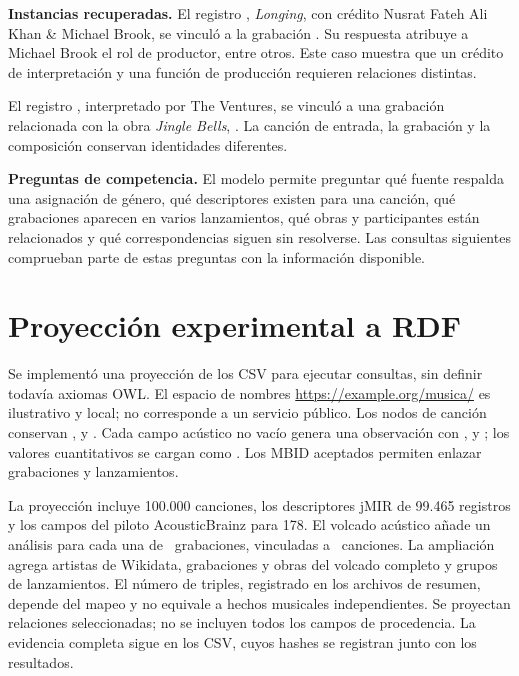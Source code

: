 \documentclass[11pt,a4paper]{article}
\begin{document}
\textbf{Instancias recuperadas.} El registro , \emph{Longing}, con crédito Nusrat Fateh Ali Khan \& Michael Brook, se vinculó a la grabación . Su respuesta atribuye a Michael Brook el rol de productor, entre otros. Este caso muestra que un crédito de interpretación y una función de producción requieren relaciones distintas.

El registro , interpretado por The Ventures, se vinculó a una grabación relacionada con la obra \emph{Jingle Bells}, . La canción de entrada, la grabación y la composición conservan identidades diferentes.

\textbf{Preguntas de competencia.} El modelo permite preguntar qué fuente respalda una asignación de género, qué descriptores existen para una canción, qué grabaciones aparecen en varios lanzamientos, qué obras y participantes están relacionados y qué correspondencias siguen sin resolverse. Las consultas siguientes comprueban parte de estas preguntas con la información disponible.

\newpage
\section{Proyección experimental a RDF}
Se implementó una proyección de los CSV para ejecutar consultas, sin definir todavía axiomas OWL. El espacio de nombres \url{https://example.org/musica/} es ilustrativo y local; no corresponde a un servicio público. Los nodos de canción conservan ,  y . Cada campo acústico no vacío genera una observación con ,  y ; los valores cuantitativos se cargan como . Los MBID aceptados permiten enlazar grabaciones y lanzamientos.

La proyección incluye 100.000 canciones, los descriptores jMIR de 99.465 registros y los campos del piloto AcousticBrainz para 178. El volcado acústico añade un análisis para cada una de \GrabacionesAcousticBrainz\ grabaciones, vinculadas a \CancionesAcousticBrainz\ canciones. La ampliación agrega artistas de Wikidata, grabaciones y obras del volcado completo y grupos de lanzamientos. El número de triples, registrado en los archivos de resumen, depende del mapeo y no equivale a hechos musicales independientes. Se proyectan relaciones seleccionadas; no se incluyen todos los campos de procedencia. La evidencia completa sigue en los CSV, cuyos hashes se registran junto con los resultados.
\end{document}
